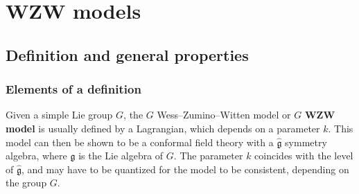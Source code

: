 \documentclass[12pt, a4paper, notitlepage, twoside]{report}
\numberwithin{equation}{section}
\theoremstyle{break}
\begin{document}
\section{WZW models}

\subsection{Definition and general properties}

\subsubsection{Elements of a definition}

Given a simple Lie group $G$, the $G$ Wess--Zumino--Witten model or $G$ \textbf{\boldmath WZW model} is usually defined by a Lagrangian, which depends on a parameter $k$.
This model can then be shown to be a conformal field theory with a $\hat{\mathfrak{g}}$ symmetry algebra, where $\mathfrak{g}$ is the Lie algebra of $G$.
The parameter $k$ coincides with the level of $\hat{\mathfrak{g}}$, and may have to be quantized for the model to be consistent, depending on the group $G$.
\end{document}
